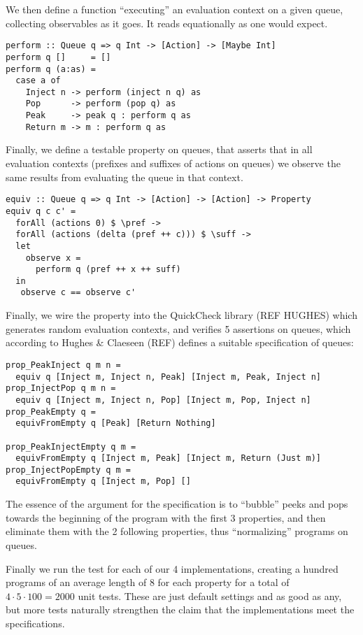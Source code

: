 \documentclass[a4paper, 12pt]{article}
\begin{document}
We then define a function ``executing'' an evaluation context on a
given queue, collecting observables as it goes. It reads equationally
as one would expect.

\begin{lstlisting}
perform :: Queue q => q Int -> [Action] -> [Maybe Int]
perform q []     = []
perform q (a:as) =
  case a of
    Inject n -> perform (inject n q) as
    Pop      -> perform (pop q) as
    Peak     -> peak q : perform q as
    Return m -> m : perform q as
\end{lstlisting}

Finally, we define a testable property on queues, that asserts that in
all evaluation contexts (prefixes and suffixes of actions on queues)
we observe the same results from evaluating the queue in that context.

\begin{lstlisting}
equiv :: Queue q => q Int -> [Action] -> [Action] -> Property
equiv q c c' =
  forAll (actions 0) $ \pref ->
  forAll (actions (delta (pref ++ c))) $ \suff ->
  let
    observe x =
      perform q (pref ++ x ++ suff)
  in
   observe c == observe c'
\end{lstlisting}

Finally, we wire the property into the QuickCheck library (REF HUGHES)
which generates random evaluation contexts, and verifies 5 assertions
on queues, which according to Hughes \& Claeseen (REF) defines a
suitable specification of queues:

\begin{lstlisting}
prop_PeakInject q m n =
  equiv q [Inject m, Inject n, Peak] [Inject m, Peak, Inject n]
prop_InjectPop q m n =
  equiv q [Inject m, Inject n, Pop] [Inject m, Pop, Inject n]
prop_PeakEmpty q =
  equivFromEmpty q [Peak] [Return Nothing]

prop_PeakInjectEmpty q m =
  equivFromEmpty q [Inject m, Peak] [Inject m, Return (Just m)]
prop_InjectPopEmpty q m =
  equivFromEmpty q [Inject m, Pop] []
\end{lstlisting}

The essence of the argument for the specification is to ``bubble''
peeks and pops towards the beginning of the program with the first 3
properties, and then eliminate them with the 2 following properties,
thus ``normalizing'' programs on queues.

Finally we run the test for each of our 4 implementations, creating a
hundred programs of an average length of 8 for each property for a
total of $4 \cdot 5 \cdot 100 = 2000$ unit tests. These are just
default settings and as good as any, but more tests naturally
strengthen the claim that the implementations meet the specifications.
\end{document}
